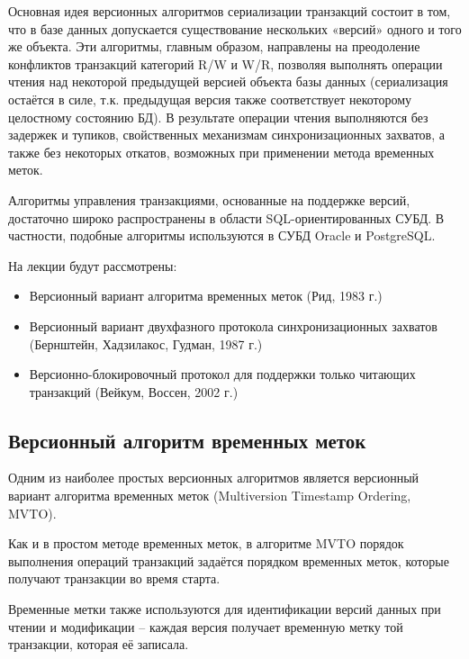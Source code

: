 \documentclass[a4paper,12pt]{article}
\begin{document}
Основная идея версионных алгоритмов сериализации транзакций состоит в том, что в базе данных допускается существование нескольких «версий» одного и того же объекта. Эти алгоритмы, главным образом, направлены на преодоление конфликтов транзакций категорий R/W и W/R, позволяя выполнять операции чтения над некоторой предыдущей версией объекта базы данных (сериализация остаётся в силе, т.к. предыдущая версия также соответствует некоторому целостному состоянию БД). В результате операции чтения выполняются без задержек и тупиков, свойственных механизмам синхронизационных захватов, а также без некоторых откатов, возможных при применении метода временных меток.

Алгоритмы управления транзакциями, основанные на поддержке версий, достаточно широко распространены в области SQL-ориентированных СУБД. В частности, подобные алгоритмы используются в СУБД Oracle и PostgreSQL.

На лекции будут рассмотрены:
\begin{itemize}
    \item Версионный вариант алгоритма временных меток (Рид, 1983 г.)
    \item Версионный вариант двухфазного протокола синхронизационных захватов (Бернштейн, Хадзилакос, Гудман, 1987 г.)
    \item Версионно-блокировочный протокол для поддержки только читающих транзакций (Вейкум, Воссен, 2002 г.)
\end{itemize}

\subsection{Версионный алгоритм временных меток}

Одним из наиболее простых версионных алгоритмов является версионный вариант алгоритма временных меток (Multiversion Timestamp Ordering, MVTO).

Как и в простом методе временных меток, в алгоритме MVTO порядок выполнения операций транзакций задаётся порядком временных меток, которые получают транзакции во время старта.

Временные метки также используются для идентификации версий данных при чтении и модификации – каждая версия получает временную метку той транзакции, которая её записала.
\end{document}
